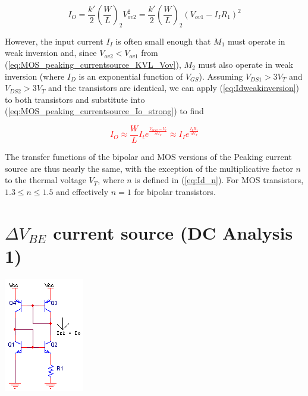 \begin{equation}
I_{O} = \frac{k'}{2}\left(\frac{W}{L}\right)_{2}V_{ov2}^{2} = \frac{k'}{2}\left(\frac{W}{L}\right)_{2}(V_{ov1}-I_{I}R_{1})^{2}
\label{eq:MOS_peaking_currentsource_Io_strong}
\end{equation}

However, the input current $I_{I}$ is often small enough that $M_1$ must operate in weak inversion and, since $V_{ov2} < V_{ov1}$ from (\ref{eq:MOS_peaking_currentsource_KVL_Vov}), $M_2$ must also operate in weak inversion (where $I_{D}$ is an exponential function of $V_{GS}$).
Assuming $V_{DS1} > 3V_{T}$ and $V_{DS2} > 3V_{T}$ and the transistors are identical, we can apply (\ref{eq:Idweakinversion}) to both transistors and substitute into (\ref{eq:MOS_peaking_currentsource_Io_strong}) to find

\textcolor{red}{
\begin{equation}
I_{O} \approx \frac{W}{L}I_{t}e^{\frac{V_{GS2}-V_{t}}{nV_{T}}} \approx I_{I}e^{\frac{I_{I}R_{1}}{nV_{T}}}
\end{equation}
}

The transfer functions of the bipolar and MOS versions of the Peaking current source are thus nearly the same, with the exception of the multiplicative factor $n$ to the thermal voltage $V_{T}$, where $n$ is defined in (\ref{eq:Id_n}).
For MOS transistors, $1.3 \leq n \leq 1.5$ and effectively $n = 1$ for bipolar transistors. \autocite[304-305]{analysis-design-analog-ics}

\section{$\Delta V_{BE}$ current source (DC Analysis 1)}
\begin{center}
	\includegraphics{schematics/deltaVbe_currentsource.PNG}
\end{center}

